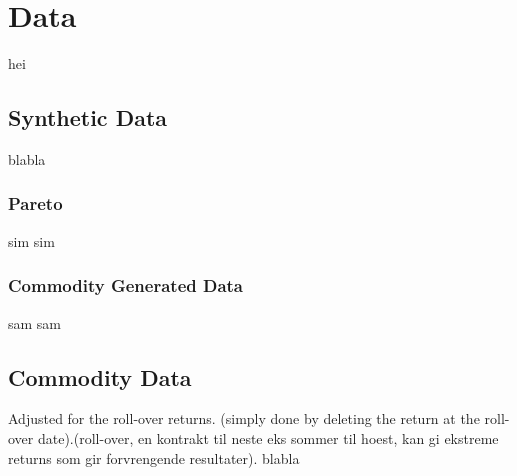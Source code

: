 \chapter[Data]{Data}
\label{ch:data}
hei
\section{Synthetic Data}
blabla
\subsection{Pareto}
sim sim
\subsection{Commodity Generated Data}
sam sam
\section{Commodity Data}
\label{ch:comdata}
Adjusted for the roll-over returns. (simply done by deleting the return at the roll-over date).(roll-over, en kontrakt til neste eks sommer til hoest, kan gi ekstreme returns som gir  forvrengende resultater).
blabla
